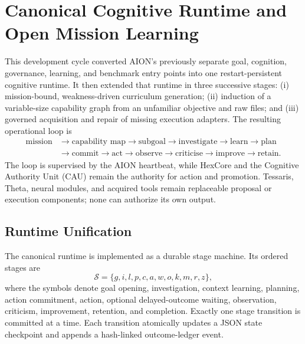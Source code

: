 
\section{Canonical Cognitive Runtime and Open Mission Learning}
\label{sec:aion-canonical-runtime-open-mission}

This development cycle converted AION's previously separate goal, cognition,
governance, learning, and benchmark entry points into one restart-persistent
cognitive runtime.  It then extended that runtime in three successive stages:
(i) mission-bound, weakness-driven curriculum generation; (ii) induction of a
variable-size capability graph from an unfamiliar objective and raw files; and
(iii) governed acquisition and repair of missing execution adapters.  The
resulting operational loop is
\begin{equation}
\begin{aligned}
\text{mission}&\rightarrow \text{capability map}
\rightarrow \text{subgoal}
\rightarrow \text{investigate}
\rightarrow \text{learn}
\rightarrow \text{plan}\\
&\rightarrow \text{commit}
\rightarrow \text{act}
\rightarrow \text{observe}
\rightarrow \text{criticise}
\rightarrow \text{improve}
\rightarrow \text{retain}.
\end{aligned}
\label{eq:canonical-cognitive-loop}
\end{equation}
The loop is supervised by the AION heartbeat, while HexCore and the Cognitive
Authority Unit (CAU) remain the authority for action and promotion.  Tessaris,
Theta, neural modules, and acquired tools remain replaceable proposal or
execution components; none can authorize its own output.

\subsection{Runtime Unification}

The canonical runtime is implemented as a durable stage machine.  Its ordered
stages are
\begin{equation}
\mathcal{S}=\{g,i,l,p,c,a,w,o,k,m,r,z\},
\end{equation}
where the symbols denote goal opening, investigation, context learning,
planning, action commitment, action, optional delayed-outcome waiting,
observation, criticism, improvement, retention, and completion.  Exactly one
stage transition is committed at a time.  Each transition atomically updates a
JSON state checkpoint and appends a hash-linked outcome-ledger event.

